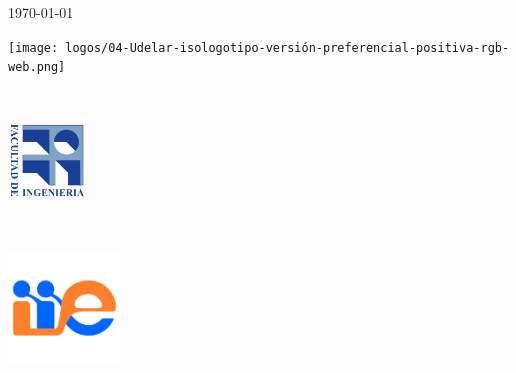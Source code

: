\begin{titlepage}


{\large \today}\\[2cm] %

\vfill %

\begin{minipage}{0.42\textwidth}
\begin{flushright}
    \texttt{[image: logos/04-Udelar-isologotipo-versión-preferencial-positiva-rgb-web.png]}
\end{flushright}
\end{minipage}
~
\begin{minipage}{0.18\textwidth}
\includegraphics[height=2cm]{logos/logo_FING_cmyk.png} %
\end{minipage}
~
\begin{minipage}{0.3\textwidth}
\begin{flushleft}
\includegraphics[height=3cm]{logos/cropped-iie_512x512-1.png}
\end{flushleft}
\end{minipage}
 



\end{titlepage}
